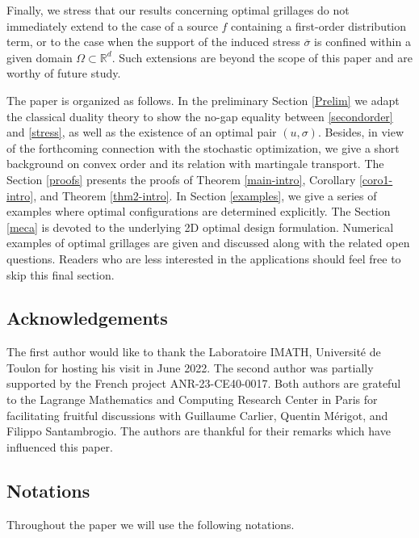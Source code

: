 \documentclass[11pt,letterpaper,reqno]{amsart}
\theoremstyle{definition}
\numberwithin{equation}{section}
\newcommand{\R}{\mathbb{R}}
\newcommand{\Rd}{\R^d}
\newcommand{\ov}{\overline}
\begin{document}
Finally, we stress that our results concerning optimal grillages do not immediately extend to the case of a source $f$ containing a first-order distribution term, or to the case when the support of the induced stress $\ov\sigma$ is confined within a given domain $\Omega\subset\Rd$. Such extensions are beyond the scope of this paper and are worthy of future study.


  
\bigskip
	
	The paper is organized as follows.
	In the preliminary Section \ref{Prelim}  we adapt the classical duality  theory to show the no-gap equality between \eqref{secondorder} and \eqref{stress}, as well as the existence of an optimal pair $(u,\sigma)$. Besides, in view of the forthcoming connection with the stochastic optimization,  we give a short background on convex order and its relation with martingale transport. 
	The Section \ref{proofs} presents the proofs of Theorem \ref{main-intro}, Corollary \ref{coro1-intro},
	and Theorem \ref{thm2-intro}.
	 In Section \ref{examples}, we give a series of examples where optimal configurations are determined  explicitly. 	 
	 The Section \ref{meca} is devoted to the underlying 2D optimal design formulation. Numerical examples of optimal grillages are given and discussed along with the related open questions. Readers who are less interested in the applications should feel free to skip this final  section.
		
	
	
	
		

	
	
	
\subsection*{Acknowledgements}  
The first author would like to thank the Laboratoire IMATH, Université de Toulon  for hosting his visit in June 2022. 
The second author was partially supported by the French project ANR-23-CE40-0017.   
Both authors are grateful to the Lagrange Mathematics and Computing Research Center in Paris for facilitating fruitful discussions with Guillaume Carlier, Quentin Mérigot, and Filippo Santambrogio. The authors are thankful for their remarks which have influenced this paper. 
    
\subsection*{Notations} Throughout the paper we will use the following notations.
\end{document}
